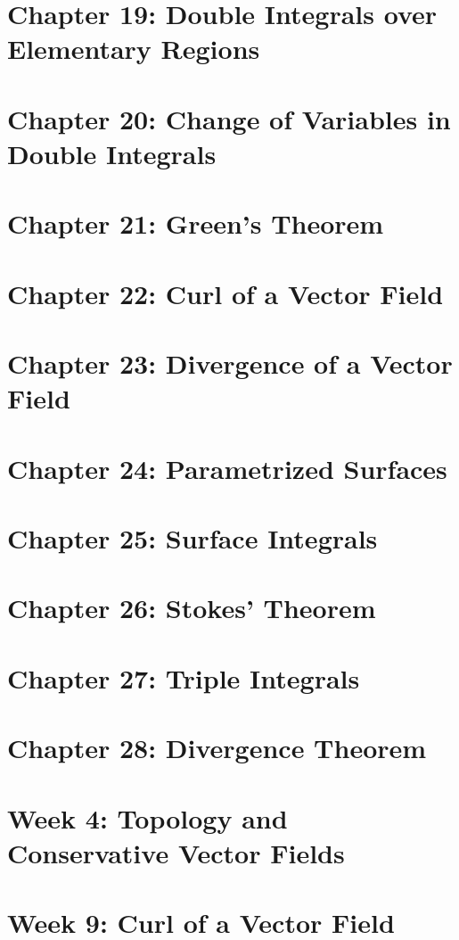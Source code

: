 \documentclass{xourse}
\begin{document}
\part{Chapter 19: Double Integrals over Elementary Regions}

\part{Chapter 20: Change of Variables in Double Integrals}

\part{Chapter 21: Green's Theorem}

\part{Chapter 22: Curl of a Vector Field}

\part{Chapter 23: Divergence of a Vector Field}

\part{Chapter 24: Parametrized Surfaces}

\part{Chapter 25: Surface Integrals}

\part{Chapter 26: Stokes' Theorem}

\part{Chapter 27: Triple Integrals}

\part{Chapter 28: Divergence Theorem}

\part{Week 4: Topology and Conservative Vector Fields} 

\part{Week 9: Curl of a Vector Field}

 
\end{document}
